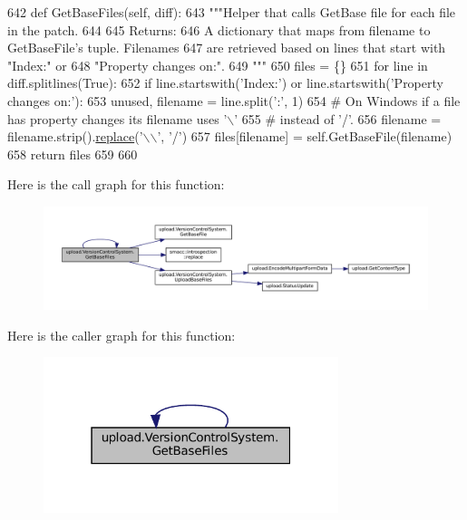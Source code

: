 \begin{DoxyCode}
642   \textcolor{keyword}{def }GetBaseFiles(self, diff):
643     \textcolor{stringliteral}{"""Helper that calls GetBase file for each file in the patch.}
644 \textcolor{stringliteral}{}
645 \textcolor{stringliteral}{    Returns:}
646 \textcolor{stringliteral}{      A dictionary that maps from filename to GetBaseFile's tuple.  Filenames}
647 \textcolor{stringliteral}{      are retrieved based on lines that start with "Index:" or}
648 \textcolor{stringliteral}{      "Property changes on:".}
649 \textcolor{stringliteral}{    """}
650     files = \{\}
651     \textcolor{keywordflow}{for} line \textcolor{keywordflow}{in} diff.splitlines(\textcolor{keyword}{True}):
652       \textcolor{keywordflow}{if} line.startswith(\textcolor{stringliteral}{'Index:'}) \textcolor{keywordflow}{or} line.startswith(\textcolor{stringliteral}{'Property changes on:'}):
653         unused, filename = line.split(\textcolor{stringliteral}{':'}, 1)
654         \textcolor{comment}{# On Windows if a file has property changes its filename uses '\(\backslash\)'}
655         \textcolor{comment}{# instead of '/'.}
656         filename = filename.strip().\hyperlink{namespacesmacc_1_1introspection_a48571b9bf3b115d2a83cc0147c96d0bd}{replace}(\textcolor{stringliteral}{'\(\backslash\)\(\backslash\)'}, \textcolor{stringliteral}{'/'})
657         files[filename] = self.GetBaseFile(filename)
658     \textcolor{keywordflow}{return} files
659 
660 
\end{DoxyCode}
Here is the call graph for this function\+:
\nopagebreak
\begin{figure}[H]
\begin{center}
\leavevmode
\includegraphics[width=350pt]{classupload_1_1VersionControlSystem_a812c3b3daf90c88b015fa4b26252e291_cgraph}
\end{center}
\end{figure}
Here is the caller graph for this function\+:
\nopagebreak
\begin{figure}[H]
\begin{center}
\leavevmode
\includegraphics[width=244pt]{classupload_1_1VersionControlSystem_a812c3b3daf90c88b015fa4b26252e291_icgraph}
\end{center}
\end{figure}
